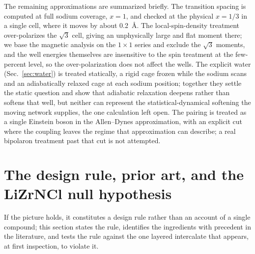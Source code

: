 \documentclass[aps,10pt,preprint,superscriptaddress,floatfix]{revtex4-2}
\begin{document}
The remaining approximations are summarized briefly. The transition spacing is computed at full
sodium coverage, $x=1$,
and checked at the physical $x=1/3$ in a single cell, where it moves by about 0.2~\AA. The
local-spin-density treatment over-polarizes the $\sqrt3$ cell, giving an unphysically large and flat
moment there; we base the magnetic analysis on the $1\times1$ series and exclude the $\sqrt3$
moments, and the well energies themselves are insensitive to the spin treatment at the few-percent
level, so the over-polarization does not affect the wells. The explicit water (Sec.~\ref{sec:water}) is treated
statically, a rigid cage frozen while the sodium scans and an adiabatically relaxed cage at each
sodium position; together they settle the static question and show that adiabatic relaxation
deepens rather than softens that well, but neither can represent the statistical-dynamical softening
the moving network supplies, the one calculation left open. The pairing is treated as a single
Einstein boson in the Allen--Dynes approximation, with an explicit cut where the coupling leaves the
regime that approximation can describe; a real bipolaron treatment past that cut is not attempted.

\FloatBarrier
\section{The design rule, prior art, and the LiZrNCl null hypothesis}
\label{sec:designrule}

If the picture holds, it constitutes a design rule rather than an account of a single compound;
this section states the rule, identifies the ingredients with precedent in the literature, and
tests the rule against the one layered intercalate that appears, at first inspection, to violate
it.
\end{document}
